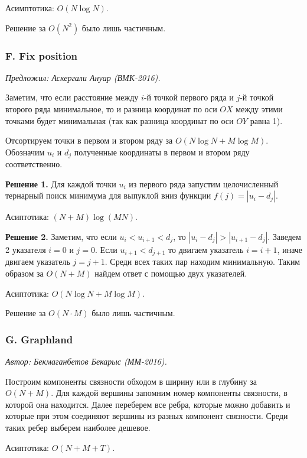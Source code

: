\documentclass[10pt, a4paper]{article}
\newcommand{\problemauthor}[1]{
\begin{flushright}
\textit{Автор: #1}
\end{flushright}
}
\newcommand{\problemofferer}[1]{
\begin{flushright}
\textit{Предложил: #1}
\end{flushright}
}
\begin{document}
Асимптотика: $O(N \log N)$. 

Решение за $O(N^2)$ было лишь частичным.

\subsubsection*{F. Fix position}


\problemofferer{Аскергали Ануар (ВМК-2016).}

Заметим, что если расстояние между $i$-й точкой первого ряда и $j$-й точкой второго ряда минимальное, то и разница координат по оси $OX$ между этими точками будет минимальная (так как разница координат по оси $OY$ равна 1). 

Отсортируем точки в первом и втором ряду за $O(N \log N + M \log M)$. Обозначим $u_i$ и $d_j$ полученные координаты в первом и втором ряду соответственно.

\textbf{Решение 1.} Для каждой точки $u_i$ из первого ряда запустим целочисленный тернарный поиск минимума для выпуклой вниз функции $f(j) = |u_i  - d_j|$.

Асиптотика: $(N + M) \log (M N)$.

\textbf{Решение 2.} Заметим, что если $u_i < u_{i+1} < d_j$, то $|u_i - d_j|> |u_{i+1} - d_j|$. Заведем 2 указателя $i = 0$ и $j = 0$. Если $u_{i+1} < d_{j + 1}$ то двигаем указатель $i = i + 1$, иначе двигаем указатель $j = j + 1$. Среди всех таких пар находим минимальную. Таким образом за $O(N + M)$ найдем ответ с помощью двух указателей.

Асиптотика: $O(N \log N + M \log M)$.

Решение за $O(N \cdot M)$ было лишь частичным.

\subsubsection*{G. Graphland}


\problemauthor{Бекмаганбетов Бекарыс (ММ-2016).}


Построим компоненты связности обходом в ширину или в глубину за $O(N + M)$. Для каждой вершины запомним номер компоненты связности, в которой она находится. Далее переберем все ребра, которые можно добавить и которые при этом соединяют вершины из разных компонент связности. Среди таких ребер выберем наиболее дешевое.

Асиптотика: $O(N + M + T)$.
\end{document}
